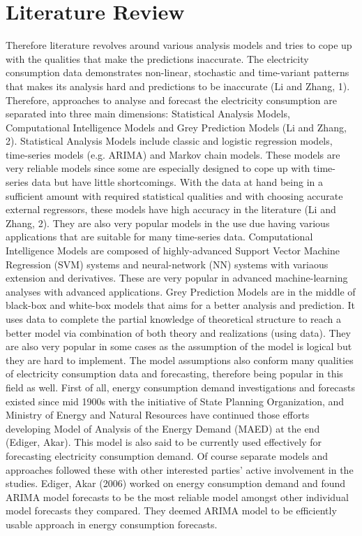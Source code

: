\documentclass[11pt, a4paper, leqno]{article}
\begin{document}
\pagebreak
\section{Literature Review} %
\label{sec:litrew}

Therefore literature revolves around various analysis models and tries to cope up with the qualities that make the predictions inaccurate. The electricity consumption data demonstrates non-linear, stochastic and time-variant patterns that makes its analysis hard and predictions to be inaccurate (Li and Zhang, 1). Therefore, approaches to analyse and forecast the electricity consumption are separated into three main dimensions: Statistical Analysis Models, Computational Intelligence Models and Grey Prediction Models (Li and Zhang, 2).
Statistical Analysis Models include classic and logistic regression models, time-series models (e.g. ARIMA) and Markov chain models. These models are very reliable models since some are especially designed to cope up with time-series data but have little shortcomings. With the data at hand being in a sufficient amount with required statistical qualities and with choosing accurate external regressors, these models have high accuracy in the literature (Li and Zhang, 2). They are also very popular models in the use due having various applications that are suitable for many time-series data.
Computational Intelligence Models are composed of highly-advanced Support Vector Machine Regression (SVM) systems and neural-network (NN) systems with variaous extension and derivatives. These are very popular in advanced machine-learning analyses with advanced applications.
Grey Prediction Models are in the middle of black-box and white-box models that aims for a better analysis and prediction. It uses data to complete the partial knowledge of theoretical structure to reach a better model via combination of both theory and realizations (using data). They are also very popular in some cases as the assumption of the model is logical but they are hard to implement. The model assumptions also conform many qualities of electricity consumption data and forecasting, therefore being popular in this field as well.
First of all, energy consumption demand investigations and forecasts existed since mid 1900s with the initiative of State Planning Organization, and Ministry of Energy and Natural Resources have continued those efforts developing Model of Analysis of the Energy Demand (MAED) at the end (Ediger, Akar). This model is also said to be currently used effectively for forecasting electricity consumption demand. Of course separate models and approaches followed these with other interested parties’ active involvement in the studies.
Ediger, Akar (2006) worked on energy consumption demand and found ARIMA model forecasts to be the most reliable model amongst other individual model forecasts they compared. They deemed ARIMA model to be efficiently usable approach in energy consumption forecasts.
\end{document}
